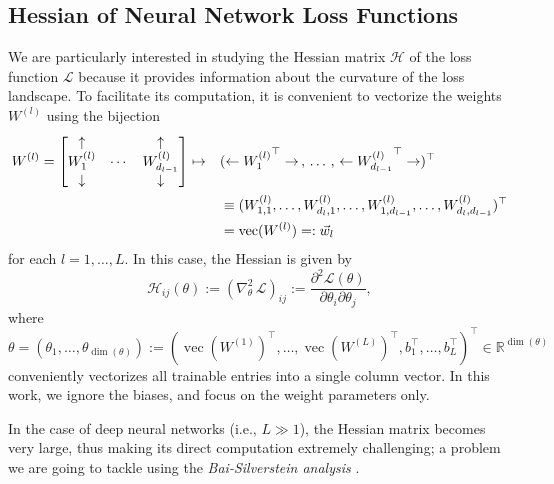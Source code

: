 \documentclass{article}
\begin{document}
\subsection{Hessian of Neural Network Loss Functions}
We are particularly interested in studying the Hessian matrix $\mathcal{H}$ of the loss function $\mathcal{L}$ because it provides information about the curvature of the loss landscape. To facilitate its computation, it is convenient to vectorize the weights $W^{(l)}$ using the bijection
\begin{align}W^{(l)}=\begin{bmatrix} \uparrow & & \uparrow \\ {W_1^{(l)}} & \cdots & {W_{d_{l-1}}^{(l)}} \\ \downarrow & & \downarrow \end{bmatrix}\mapsto\quad&(\leftarrow {W_1^{(l)}}^\top\rightarrow\,,\,\dots\,,\,\leftarrow{W_{d_{l-1}}^{(l)}}^\top\rightarrow)^\top
\\ &\equiv (W^{(l)}_{1,1},\dots,W^{(l)}_{d_l,1},\dots,W^{(l)}_{1,d_{l-1}},\dots,W^{(l)}_{d_l,d_{l-1}})^\top \notag
\\ &=\operatorname{vec}(W^{(l)})=:\vec{w}_l \notag
\end{align}
for each $l=1,\dots,L$. In this case, the Hessian is given by
\begin{equation}
\mathcal{H}_{ij}(\theta):=(\nabla_{\theta}^2\,\mathcal{L})_{ij}:=\frac{\partial^2\mathcal{L}(\theta)}{\partial\theta_i\partial\theta_j},
\end{equation}
where
\begin{equation}
\theta=(\theta_1,\dots,\theta_{\dim(\theta)}):=(\operatorname{vec}(W^{(1)})^\top,\dots,\operatorname{vec}(W^{(L)})^\top, b_1^\top,\dots,b_L^\top)^\top\in\mathbb{R}^{\dim(\theta)}
\end{equation}
conveniently vectorizes all trainable entries into a single column vector. In this work, we ignore the biases, and focus on the weight parameters only.
\bigskip
\par
In the case of deep neural networks (i.e., $L\gg1$), the Hessian matrix becomes very large, thus making its direct computation extremely challenging; a problem we are going to tackle using the \emph{Bai-Silverstein analysis} \cite{bai}.
\end{document}
